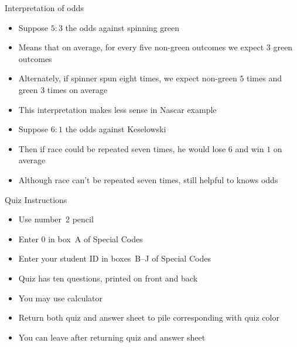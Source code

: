 \documentclass[handout]{beamer}
\theoremstyle{definition}
\begin{document}
\begin{frame}{Interpretation of odds} 
\begin{itemize}
\item Suppose $5:3$ the odds against spinning green
\item Means that on average, for every five non-green outcomes
we expect $3$ green outcomes
\item Alternately, if spinner spun eight times, we expect
non-green $5$ times and green $3$ times on average
\item This interpretation makes less sense in Nascar example
\item Suppose $6:1$ the odds against Keselowski
\item Then if race could be repeated seven times, he would
lose $6$ and win $1$ on average
\item Although race can't be repeated seven times,
still helpful to knows odds
\end{itemize}
\end{frame}

\begin{frame}{Quiz Instructions}
\begin{itemize}
\item Use number~2 pencil
\item Enter $0$ in box~A of Special Codes
\item Enter your student ID in boxes~B--J of Special Codes
\item Quiz has ten questions, printed on front and back
\item You \alert{may} use calculator
\item Return both quiz and answer sheet to pile
corresponding with quiz color
\item You can leave after returning quiz and answer sheet
\end{itemize}
\end{frame}
\end{document}
